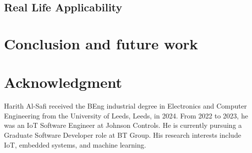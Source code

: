 \documentclass{ieeeaccess}
\begin{document}
\subsection{Real Life Applicability}

\section{Conclusion and future work}
\label{sec:conclusion}

\section*{Acknowledgment}




\begin{IEEEbiography}{Harith Al-Safi} received the BEng industrial degree in Electronics and Computer Engineering from
    the University of Leeds, Leeds, in 2024. From 2022 to 2023, he was an IoT Software Engineer at Johnson Controls. He is currently pursuing a Graduate Software Developer role at BT Group. His research interests include IoT, embedded systems, and machine learning.
\end{IEEEbiography}
\end{document}
